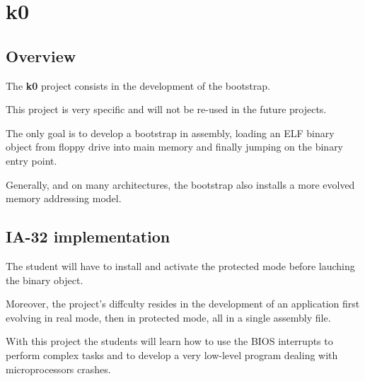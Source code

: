 
%
%

\section{k0}

%
%

\subsection{Overview}

The \textbf{k0} project consists in the development of the bootstrap.

This project is very specific and will not be re-used in the future
projects.

The only  goal is to develop  a bootstrap in assembly,  loading an ELF
binary object from  floppy drive into main memory  and finally jumping
on the binary entry point.

Generally, and on many architectures, the bootstrap also installs
a more evolved memory addressing model.

%
%

\subsection{IA-32 implementation}

The student will have to install and activate the protected mode before
lauching the binary object.

Moreover, the project's diffculty resides in the development of an
application first evolving in real mode, then in protected mode, all
in a single assembly file.

With this project the students will learn how to use the BIOS interrupts
to perform complex tasks and to develop a very low-level program dealing
with microprocessors crashes.
